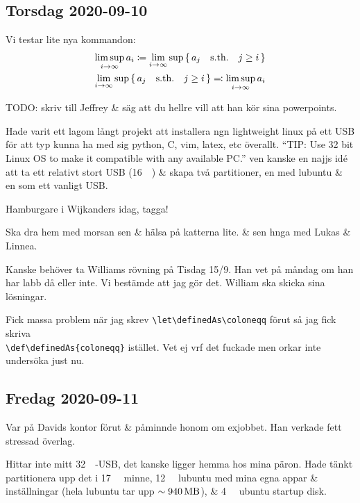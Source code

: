 \subsection{Torsdag 2020-09-10}

Vi testar lite nya kommandon:
\begin{align}
	\limsup_{i \to \infty} a_i \definedas \lim_{i \to \infty} \sup \set{a_j \suchthat j \geq i}\\
	\lim_{i \to \infty} \sup \set{a_j \suchthat j \geq i} \defines \limsup_{i \to \infty} a_i
\end{align}

TODO: skriv till Jeffrey \& säg att du hellre vill att han kör sina powerpoints.

Hade varit ett lagom långt projekt att installera ngn lightweight linux på ett USB för att typ kunna ha med sig python, C, vim, latex, etc överallt. \enquote{TIP: Use 32 bit Linux OS to make it compatible with any available PC.} ven kanske en najjs idé att ta ett relativt stort USB (\SI{16}{\giga \byte}) \& skapa två partitioner, en med lubuntu \& en som ett vanligt USB.

\bigskip

Hamburgare i Wijkanders idag, tagga!

Ska dra hem med morsan sen \& hälsa på katterna lite. \& sen hnga med Lukas \& Linnea.

\bigskip

Kanske behöver ta Williams rövning på Tisdag 15/9. Han vet på måndag om han har labb då eller inte. Vi bestämde att jag gör det. William ska skicka sina lösningar.

\bigskip

Fick massa problem när jag skrev \verb|\let\definedAs\coloneqq| förut så jag fick skriva \\\verb|\def\definedAs{coloneqq}| istället. Vet ej vrf det fuckade men orkar inte undersöka just nu.


\subsection{Fredag 2020-09-11}

Var på Davids kontor förut \& påminnde honom om exjobbet. Han verkade fett stressad överlag.

\bigskip

Hittar inte mitt \SI{32}{\giga \byte}-USB, det kanske ligger hemma hos mina päron. Hade tänkt partitionera upp det i \SI{17}{\giga \byte} minne, \SI{12}{\giga \byte} lubuntu med mina egna appar \& inställningar (hela lubuntu tar upp $\sim \SI{940}{\mega \byte}$), \& \SI{4}{\giga \byte} ubuntu startup disk.

